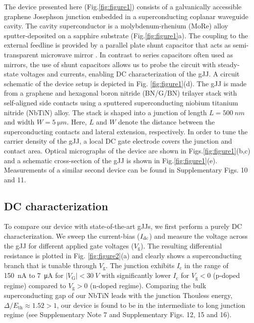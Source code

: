 \documentclass[preprint,
  onecolumn,
  notitlepage,
  amsmath,amssymb,
  aip,
  apl,
]{revtex4-1}
\begin{document}
The device presented here (Fig.\ref{fig:figure1}) consists of a galvanically accessible graphene Josephson junction embedded in a superconducting coplanar waveguide cavity.
The cavity superconductor is a molybdenum-rhenium (MoRe) alloy sputter-deposited on a sapphire substrate (Fig.\ref{fig:figure1}a).
The coupling to the external feedline is provided by a parallel plate shunt capacitor that acts as semi-transparent microwave mirror \cite{bosman_broadband_2015,singh_molybdenumrhenium_2014}.
In contrast to series capacitors often used as mirrors, the use of shunt capacitors allows us to probe the circuit with steady-state voltages and currents, enabling DC characterization of the gJJ.
A circuit schematic of the device setup is depicted in Fig. \ref{fig:figure1}(d).
The gJJ is made from a graphene and hexagonal boron nitride (BN/G/BN) trilayer stack with self-aligned side contacts \cite{pizzocchero_hot_2016,wang_onedimensional_2013} using a sputtered superconducting niobium titanium nitride (NbTiN) alloy.
The stack is shaped into a junction of length $L=\SI{500}{nm}$ and width $W=\SI{5}{\micro m}$.
Here, $L$ and $W$ denote the distance between the superconducting contacts and lateral extension, respectively.
In order to tune the carrier density of the gJJ, a local DC gate electrode covers the junction and contact area.
Optical micrographs of the device are shown in Figs.\ref{fig:figure1}(b,c) and a schematic cross-section of the gJJ is shown in Fig.\ref{fig:figure1}(e).
Measurements of a similar second device can be found in Supplementary Figs. 10 and 11.

\subsection{DC characterization}

To compare our device with state-of-the-art gJJs, we first perform a purely DC characterization.
We sweep the current-bias ($I_{\rm dc}$) and measure the voltage across the gJJ for different applied gate voltages ($V_\textrm{g}$).
The resulting differential resistance is plotted in Fig. \ref{fig:figure2}(a) and clearly shows a superconducting branch that is tunable through $V_\textrm{g}$.
The junction exhibits $I_\textrm{c}$ in the range of \SI{150}{nA} to \SI{7}{\micro A} for $\lvert V_\mathrm{G} \rvert<\SI{30}{V}$ with significantly lower $I_\textrm{c}$ for $V_\textrm{g}<0$ (p-doped regime) compared to $V_\textrm{g}>0$ (n-doped regime).
Comparing the bulk superconducting gap of our NbTiN leads with the junction Thouless energy, $\Delta/E_\textrm{th}\approx1.52>1$, our device is found to be in the intermediate to long junction regime (see Supplementary Note 7 and Supplementary Figs. 12, 15 and 16).
\end{document}
